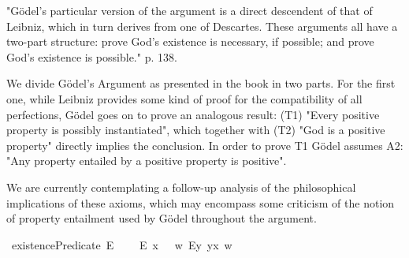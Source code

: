 %
\begin{isabellebody}%
%
%
\isadelimtheory
%
\endisadelimtheory
%
\isatagtheory
%
\endisatagtheory
{\isafoldtheory}%
%
\isadelimtheory
%
\endisadelimtheory
%
\isamarkuptrue%
%
\begin{isamarkuptext}%
"G\"odel's particular version of the argument is a direct descendent of that of Leibniz, which in turn derives
  from one of Descartes. These arguments all have a two-part structure: prove God's existence is necessary,
  if possible; and prove God's existence is possible." \cite{fitting_book} p. 138.%
\end{isamarkuptext}\isamarkuptrue%
%
\isamarkuptrue%
%
\begin{isamarkuptext}%
We divide G\"odel's Argument as presented in the book in two parts. For the first one, while Leibniz provides
  some kind of proof for the compatibility of all perfections, G\"odel goes on to prove an analogous result:
 (T1) "Every positive property is possibly instantiated", which together with (T2) "God is a positive property"
  directly implies the conclusion. In order to prove T1 G\"odel assumes A2: "Any property entailed by a positive property is positive".%
\end{isamarkuptext}\isamarkuptrue%
%
\begin{isamarkuptext}%
We are currently contemplating a follow-up analysis of the philosophical implications of these axioms,
 which may encompass some criticism of the notion of property entailment used by G\"odel throughout the argument.%
\end{isamarkuptext}\isamarkuptrue%
%
\isamarkuptrue%
\isamarkupfalse%
\ existencePredicate{\isacharcolon}{\isacharcolon}{\isachardoublequoteopen}{\isasymup}{\isasymlangle}{\isasymzero}{\isasymrangle}{\isachardoublequoteclose}\ {\isacharparenleft}{\isachardoublequoteopen}E{\isacharbang}{\isachardoublequoteclose}{\isacharparenright}\ \isanewline
\ \ \ {\isachardoublequoteopen}E{\isacharbang}\ x\ \ {\isasymequiv}\ {\isasymlambda}w{\isachardot}\ {\isacharparenleft}\isactrlbold {\isasymexists}\isactrlsup Ey{\isachardot}\ y\isactrlbold {\isasymapprox}x{\isacharparenright}\ w{\isachardoublequoteclose}\ %
\isanewline
\isanewline
{}\isamarkupfalse%

\end{isabellebody}
